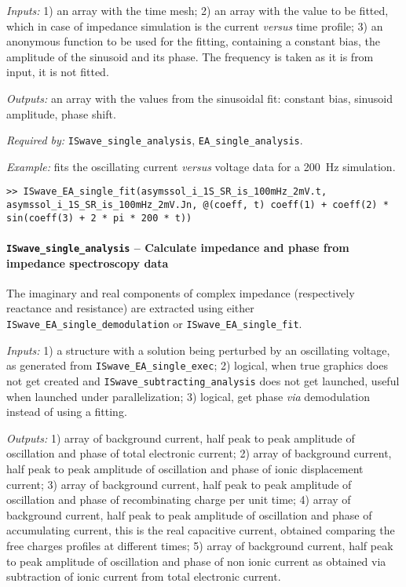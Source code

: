 	\textit{Inputs:} 1) an array with the time mesh;
	2) an array with the value to be fitted, which in case of impedance simulation is the current \textsl{versus} time profile;
	3) an anonymous function to be used for the fitting, containing
	a constant bias, the amplitude of the sinusoid and its phase. The
	frequency is taken as it is from input, it is not fitted.

	\textit{Outputs:} an array with the values from the sinusoidal fit: constant
	bias, sinusoid amplitude, phase shift.


	\textit{Required by:} \texttt{IS\-wave\_single\_analysis}, \texttt{EA\_single\_analysis}.

	\textit{Example:} fits the oscillating current \textsl{versus} voltage data for a \SI{200}{\Hz} simulation.
	\begin{lstlisting}[style=Matlab-editor]
>> ISwave_EA_single_fit(asymssol_i_1S_SR_is_100mHz_2mV.t, asymssol_i_1S_SR_is_100mHz_2mV.Jn, @(coeff, t) coeff(1) + coeff(2) * sin(coeff(3) + 2 * pi * 200 * t))
\end{lstlisting}



	\paragraph{\texttt{IS\-wave\_single\_analysis} -- Calculate impedance and phase from impedance spectroscopy data}
	The imaginary and real components of complex impedance (respectively reactance and resistance) are extracted using either \texttt{IS\-wave\_EA\_single\_demodulation} or \texttt{IS\-wave\_EA\_single\_fit}.

	\textit{Inputs:} 1) a structure with a solution being perturbed by an
	oscillating voltage, as generated from \texttt{IS\-wave\_EA\_single\_exec};
	2) logical, when true graphics does not get created and
	\texttt{IS\-wave\_subtracting\_analysis} does not get launched, useful when
	launched under parallelization;
	3) logical, get phase \textsl{via} demodulation instead of using a fitting.

	\textit{Outputs:} 1) array of background current, half peak to peak amplitude of
	oscillation and phase of total electronic current;
	2) array of background current, half peak to peak amplitude of
	oscillation and phase of ionic displacement current;
	3) array of background current, half peak to peak amplitude of
	oscillation and phase of recombinating charge per unit time;
	4) array of background current, half peak to peak amplitude of
	oscillation and phase of accumulating current, this is the real
	capacitive current, obtained comparing the free charges profiles at
	different times;
	5) array of background current, half peak to peak amplitude of
	oscillation and phase of non ionic current as obtained via
	subtraction of ionic current from total electronic current.

